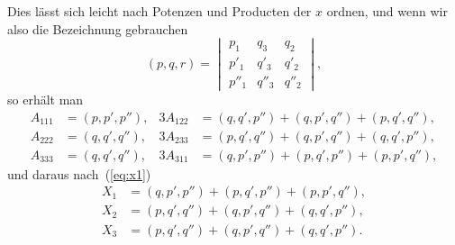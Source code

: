 \documentclass[12pt,a4paper]{article}
\theoremstyle{definition}
\begin{document}
Dies lässt sich leicht nach Potenzen und Producten der $x$ ordnen, und wenn wir also die Bezeichnung gebrauchen
\[
(p,q,r) =
\begin{vmatrix}
p_1 & q_3 & q_2\\
p'_1 & q'_3 & q'_2\\
p''_1 & q''_3 & q''_2
\end{vmatrix},
\]
so erhält man
\[
\begin{aligned}
A_{111} &= (p,p',p''), &
3A_{122} &= (q,q',p'') + (q,p',q'') + (p,q',q''),\\
A_{222} &= (q,q',q''), &
3A_{233} &= (p,q',q'') + (q,p',q'') + (q,q',p''),\\
A_{333} &= (q,q',q''), &
3A_{311} &= (q,p',p'') + (p,q',p'') + (p,p',q''),
\end{aligned}
\]
und daraus nach~(\ref{eq:x1})
\begin{equation}\label{eq:3b}
\begin{aligned}
X_1 &= (q,p',p'') + (p,q',p'') + (p,p',q''),\\
X_2 &= (p,q',q'') + (q,p',q'') + (q,q',p''),\\
X_3 &= (p,q',q'') + (q,p',q'') + (q,q',p'').
\end{aligned}
\end{equation}
\end{document}

